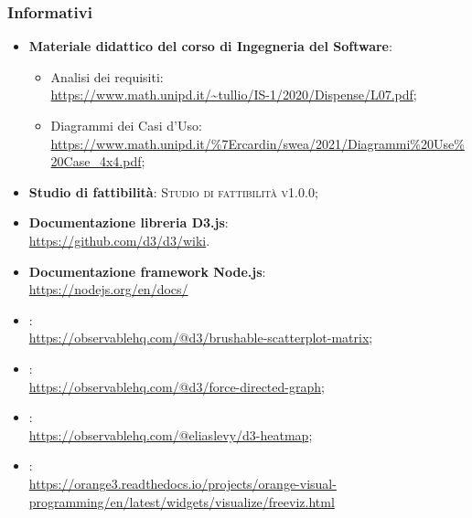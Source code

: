 \documentclass[../analisi_dei_requisiti.tex]{subfiles}
\begin{document}
\subsubsection{Informativi}%
\label{ssub:informativi}
\begin{itemize}
  \item \textbf{Materiale didattico del corso di Ingegneria del Software}:
  \begin{itemize}
    \item Analisi dei requisiti: \\
    \url{https://www.math.unipd.it/~tullio/IS-1/2020/Dispense/L07.pdf};
    \item Diagrammi dei Casi d'Uso: \\
    \url{https://www.math.unipd.it/%7Ercardin/swea/2021/Diagrammi%20Use%20Case_4x4.pdf};
  \end{itemize}
  \item \textbf{Studio di fattibilità}: \textsc{Studio di fattibilità v1.0.0};
  
  \item \textbf{Documentazione libreria D3.js}: \\
  \url{https://github.com/d3/d3/wiki}.

  \item \textbf{Documentazione framework Node.js}: \\
  \url{https://nodejs.org/en/docs/}

  \item {}: \\ 
  \url{https://observablehq.com/@d3/brushable-scatterplot-matrix};
        
  \item {}: \\  
  \url{https://observablehq.com/@d3/force-directed-graph};

  \item {}: \\ 
  \url{https://observablehq.com/@eliaslevy/d3-heatmap}; 
        
  \item {}: \\ 
  \url{https://orange3.readthedocs.io/projects/orange-visual-programming/en/latest/widgets/visualize/freeviz.html}
\end{itemize}
\end{document}
